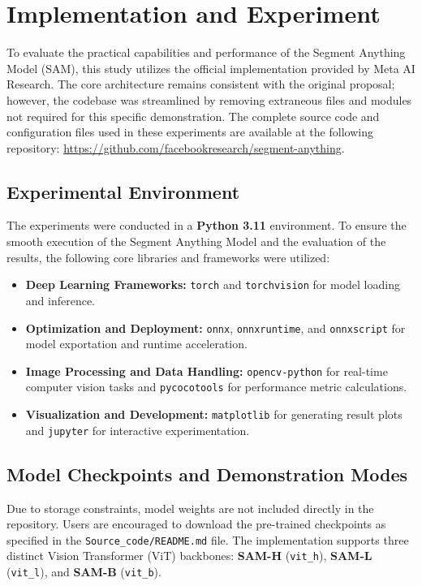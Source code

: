 \chapter{Implementation and Experiment}
To evaluate the practical capabilities and performance of the Segment Anything Model (SAM), this study utilizes the official implementation provided by Meta AI Research. The core architecture remains consistent with the original proposal; however, the codebase was streamlined by removing extraneous files and modules not required for this specific demonstration. The complete source code and configuration files used in these experiments are available at the following repository: \url{https://github.com/facebookresearch/segment-anything}.

\section{Experimental Environment}
The experiments were conducted in a \textbf{Python 3.11} environment. To ensure the smooth execution of the Segment Anything Model and the evaluation of the results, the following core libraries and frameworks were utilized:

\begin{itemize}
	\item \textbf{Deep Learning Frameworks:} \texttt{torch} and \texttt{torchvision} for model loading and inference.
	\item \textbf{Optimization and Deployment:} \texttt{onnx}, \texttt{onnxruntime}, and \texttt{onnxscript} for model exportation and runtime acceleration.
	\item \textbf{Image Processing and Data Handling:} \texttt{opencv-python} for real-time computer vision tasks and \texttt{pycocotools} for performance metric calculations.
	\item \textbf{Visualization and Development:} \texttt{matplotlib} for generating result plots and \texttt{jupyter} for interactive experimentation.
\end{itemize}

\section{Model Checkpoints and Demonstration Modes}
Due to storage constraints, model weights are not included directly in the repository. Users are encouraged to download the pre-trained checkpoints as specified in the \texttt{Source\_code/README.md} file. The implementation supports three distinct Vision Transformer (ViT) backbones: \textbf{SAM-H} (\texttt{vit\_h}), \textbf{SAM-L} (\texttt{vit\_l}), and \textbf{SAM-B} (\texttt{vit\_b}).

